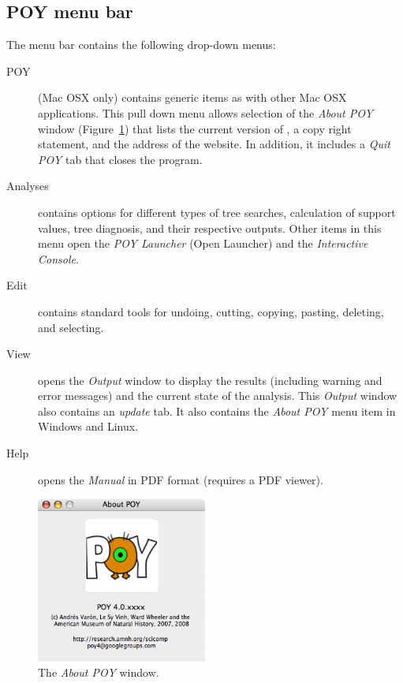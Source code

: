 \subsection{POY menu bar}
The menu bar contains the following drop-down menus:
\begin{description}
\item[POY] (Mac OSX only) contains generic items as with other Mac OSX applications. This pull down 
menu allows selection of the \emph{About POY} window (Figure~\ref{fig:about_window}) that lists the 
current version of \poy, a copy right statement, and the address of the \poy website. In addition, it includes 
a \emph{Quit POY} tab that closes the program. 
\item[Analyses]    contains options for different types of tree searches, calculation of support values, tree 
diagnosis, and their respective outputs. Other items in this menu open the \emph{POY Launcher} 
(Open Launcher) and the \emph{Interactive Console}.
\item[Edit] contains standard tools for undoing, cutting, copying, pasting, deleting, and selecting.
\item[View] opens the \emph{Output} window to display the results (including warning and error messages) 
and the current state of the analysis. This \emph{Output} window also contains an \emph{update} tab.  
It also contains the \emph{About POY} menu item in Windows and Linux.  
\item[Help] opens the \poy \emph{Manual} in PDF format (requires a PDF viewer).
\end{description}

\begin{figure}[htpb]
    \begin{center}
        \includegraphics[width=0.5\textwidth]{doc/figures/about_window.jpg}
    \end{center}
    \caption{The \emph{About POY} window.}
    \label{fig:about_window}
        
\end{figure}

